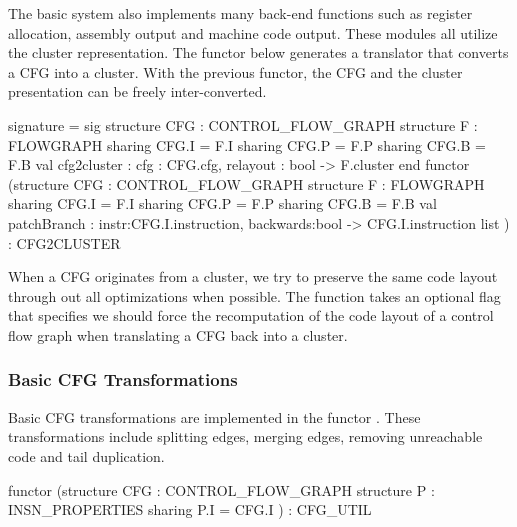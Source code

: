 The basic \MLRISC{} system also implements many back-end functions
such as register allocation, assembly output and machine code output.
These modules all utilize the cluster representation.  The 
functor  
below generates a translator
that converts a CFG into a cluster.  With the previous functor,
the CFG and the cluster presentation can be freely inter-converted.
\begin{SML}
 signature  = sig
   structure CFG : CONTROL_FLOW_GRAPH
   structure F   : FLOWGRAPH
      sharing CFG.I = F.I
      sharing CFG.P = F.P
      sharing CFG.B = F.B
   val cfg2cluster : { cfg : CFG.cfg, relayout : bool } -> F.cluster
 end 
 functor 
   (structure CFG  : CONTROL_FLOW_GRAPH
    structure F    : FLOWGRAPH
       sharing CFG.I = F.I
       sharing CFG.P = F.P
       sharing CFG.B = F.B
    val patchBranch : {instr:CFG.I.instruction, backwards:bool} -> 
                         CFG.I.instruction list
   ) : CFG2CLUSTER
\end{SML}

When a CFG originates from a cluster, we try to preserve
the same code layout through out all optimizations when possible.
The function  takes an optional flag 
that specifies we should force the recomputation of
the code layout of a control flow graph when translating a CFG
back into a cluster.

\subsubsection{Basic CFG Transformations}

Basic CFG transformations are implemented in the functor 
.  These transformations include splitting edges, merging
edges, removing unreachable code and tail duplication.
\begin{SML}
   functor 
      (structure CFG : CONTROL_FLOW_GRAPH
       structure P   : INSN_PROPERTIES
          sharing P.I = CFG.I
      ) : CFG_UTIL
\end{SML}

